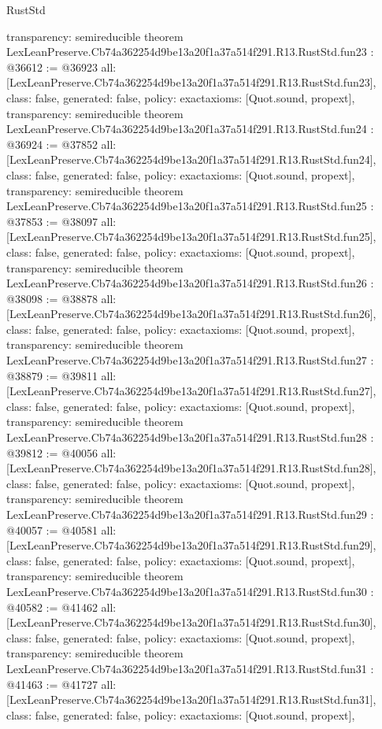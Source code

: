 \begin{lexlean}{RustStd}
\begin{coremodule}
{  transparency: semireducible
}
theorem LexLeanPreserve.Cb74a362254d9be13a20f1a37a514f291.R13.RustStd.fun23 : @36612 := @36923 {
  all: [LexLeanPreserve.Cb74a362254d9be13a20f1a37a514f291.R13.RustStd.fun23],
  class: false,
  generated: false,
  policy: exact{axioms: [Quot.sound, propext]},
  transparency: semireducible
}
theorem LexLeanPreserve.Cb74a362254d9be13a20f1a37a514f291.R13.RustStd.fun24 : @36924 := @37852 {
  all: [LexLeanPreserve.Cb74a362254d9be13a20f1a37a514f291.R13.RustStd.fun24],
  class: false,
  generated: false,
  policy: exact{axioms: [Quot.sound, propext]},
  transparency: semireducible
}
theorem LexLeanPreserve.Cb74a362254d9be13a20f1a37a514f291.R13.RustStd.fun25 : @37853 := @38097 {
  all: [LexLeanPreserve.Cb74a362254d9be13a20f1a37a514f291.R13.RustStd.fun25],
  class: false,
  generated: false,
  policy: exact{axioms: [Quot.sound, propext]},
  transparency: semireducible
}
theorem LexLeanPreserve.Cb74a362254d9be13a20f1a37a514f291.R13.RustStd.fun26 : @38098 := @38878 {
  all: [LexLeanPreserve.Cb74a362254d9be13a20f1a37a514f291.R13.RustStd.fun26],
  class: false,
  generated: false,
  policy: exact{axioms: [Quot.sound, propext]},
  transparency: semireducible
}
theorem LexLeanPreserve.Cb74a362254d9be13a20f1a37a514f291.R13.RustStd.fun27 : @38879 := @39811 {
  all: [LexLeanPreserve.Cb74a362254d9be13a20f1a37a514f291.R13.RustStd.fun27],
  class: false,
  generated: false,
  policy: exact{axioms: [Quot.sound, propext]},
  transparency: semireducible
}
theorem LexLeanPreserve.Cb74a362254d9be13a20f1a37a514f291.R13.RustStd.fun28 : @39812 := @40056 {
  all: [LexLeanPreserve.Cb74a362254d9be13a20f1a37a514f291.R13.RustStd.fun28],
  class: false,
  generated: false,
  policy: exact{axioms: [Quot.sound, propext]},
  transparency: semireducible
}
theorem LexLeanPreserve.Cb74a362254d9be13a20f1a37a514f291.R13.RustStd.fun29 : @40057 := @40581 {
  all: [LexLeanPreserve.Cb74a362254d9be13a20f1a37a514f291.R13.RustStd.fun29],
  class: false,
  generated: false,
  policy: exact{axioms: [Quot.sound, propext]},
  transparency: semireducible
}
theorem LexLeanPreserve.Cb74a362254d9be13a20f1a37a514f291.R13.RustStd.fun30 : @40582 := @41462 {
  all: [LexLeanPreserve.Cb74a362254d9be13a20f1a37a514f291.R13.RustStd.fun30],
  class: false,
  generated: false,
  policy: exact{axioms: [Quot.sound, propext]},
  transparency: semireducible
}
theorem LexLeanPreserve.Cb74a362254d9be13a20f1a37a514f291.R13.RustStd.fun31 : @41463 := @41727 {
  all: [LexLeanPreserve.Cb74a362254d9be13a20f1a37a514f291.R13.RustStd.fun31],
  class: false,
  generated: false,
  policy: exact{axioms: [Quot.sound, propext]},
}
\end{coremodule}
\end{lexlean}
